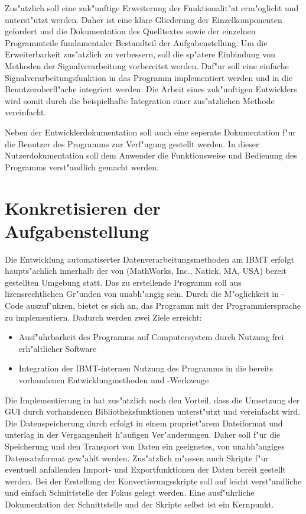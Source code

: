 Zus"atzlich soll eine zuk"unftige Erweiterung der Funktionalit"at erm"oglicht und unterst"utzt werden.
Daher ist eine klare Gliederung der Einzelkomponenten gefordert und die Dokumentation des Quelltextes sowie der einzelnen Programmteile fundamentaler Bestandteil der Aufgabenstellung.
Um die Erweiterbarkeit zus"atzlich zu verbessern, soll die sp"atere Einbindung von Methoden der Signalverarbeitung vorbereitet werden.
Daf"ur soll eine einfache Signalverarbeitungsfunktion in das Programm implementiert werden und in die Benutzeroberfl"ache integriert werden.
Die Arbeit eines zuk"unftigen Entwicklers wird somit durch die beispielhafte Integration einer zus"atzlichen Methode vereinfacht.

Neben der Entwicklerdokumentation soll auch eine seperate Dokumentation f"ur die Benutzer des Programms zur Verf"ugung gestellt werden.
In dieser Nutzerdokumentation soll dem Anwender die Funktionsweise und Bedienung des Programms verst"andlich gemacht werden.



\section{Konkretisieren der Aufgabenstellung}

Die Entwicklung automatiserter Datenverarbeitungsmethoden am \ac{IBMT} erfolgt haupts"achlich innerhalb der von \ml (MathWorks, Inc., Natick, MA, USA) bereit gestellten Umgebung statt.
Das zu erstellende Programm soll aus lizensrechtlichen Gr"unden von \ml unabh"angig sein.
Durch die M"oglichkeit in \ml \javaNS-Code auszuf"uhren, bietet es sich an, das Programm mit der Programmiersprache \java zu implementiern.
Dadurch werden zwei Ziele erreicht:
\begin{itemize}
	\item Ausf"uhrbarkeit des Programms auf Computersystem durch Nutzung frei erh"altlicher Software
	\item Integration der \ac{IBMT}-internen Nutzung des Programms in die bereits vorhandenen Entwicklungmethoden und -Werkzeuge
\end{itemize}
Die Implementierung in \java hat zus"atzlich noch den Vorteil, dass die Umsetzung der \ac{GUI} durch vorhandenen Bibliotheksfunktionen unterst"utzt und vereinfacht wird.
Die Datenspeicherung durch \ml erfolgt in einem propriet"arem Dateiformat und unterlag in der Vergangenheit h"aufigen Ver"anderungen.
Daher soll f"ur die Speicherung und den Transport von Daten ein geeignetes, von \ml unabh"angiges Datensatzformat gew"ahlt werden.
Zus"atzlich m"ussen auch Skripte f"ur eventuell anfallenden Import- und Exportfunktionen der Daten bereit gestellt werden.
Bei der Erstellung der Konvertierungsskripte soll auf leicht verst"andliche und einfach Schnittstelle der Fokus gelegt werden.
Eine ausf"uhrliche Dokumentation der Schnittstelle und der Skripte selbst ist ein Kernpunkt.

